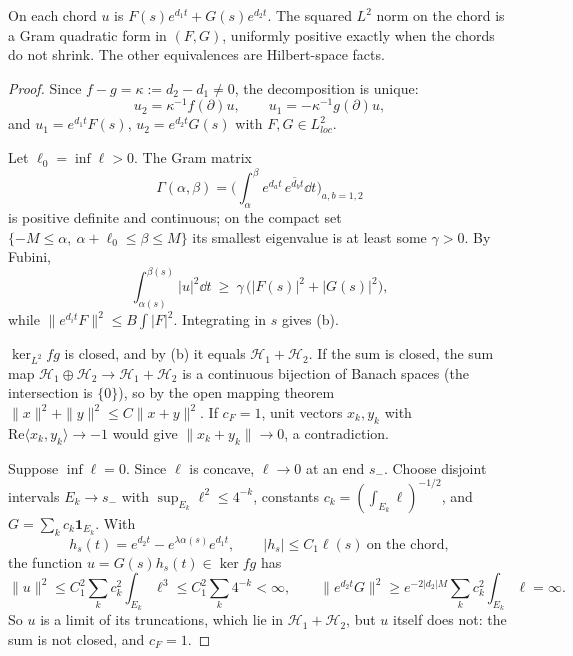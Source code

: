 \begin{proofidea}
On each chord $u$ is $F(s)e^{d_1t}+G(s)e^{d_2t}$. The squared $L^2$ norm on the chord is a Gram quadratic form in $(F,G)$, uniformly positive exactly when the chords do not shrink. The other equivalences are Hilbert-space facts.
\end{proofidea}

\begin{proof}
Since $f-g=\kappa:=d_2-d_1\ne0$, the decomposition is unique:
\[
u_2=\kappa^{-1}f(\partial)u,\qquad u_1=-\kappa^{-1}g(\partial)u,
\]
and $u_1=e^{d_1t}F(s)$, $u_2=e^{d_2t}G(s)$ with $F,G\in L^2_{loc}$.

Let $\ell_0=\inf\ell>0$. The Gram matrix
\[
\Gamma(\alpha,\beta)=\Big(\int_\alpha^\beta e^{d_at}\,\overline{e^{d_bt}}\dd t\Big)_{a,b=1,2}
\]
is positive definite and continuous; on the compact set $\{-M\le\alpha,\ \alpha+\ell_0\le\beta\le M\}$ its smallest eigenvalue is at least some $\gamma>0$. By Fubini,
\[
\int_{\alpha(s)}^{\beta(s)}|u|^2\dd t\ \ge\ \gamma\,\big(|F(s)|^2+|G(s)|^2\big),
\]
while $\|e^{d_it}F\|^2\le B\int|F|^2$. Integrating in $s$ gives (b).

$\ker_{L^2}fg$ is closed, and by (b) it equals $\mathcal H_1+\mathcal H_2$. If the sum is closed, the sum map $\mathcal H_1\oplus\mathcal H_2\to\mathcal H_1+\mathcal H_2$ is a continuous bijection of Banach spaces (the intersection is $\{0\}$), so by the open mapping theorem $\|x\|^2+\|y\|^2\le C\|x+y\|^2$. If $c_F=1$, unit vectors $x_k,y_k$ with $\mathrm{Re}\langle x_k,y_k\rangle\to-1$ would give $\|x_k+y_k\|\to0$, a contradiction.

Suppose $\inf\ell=0$. Since $\ell$ is concave, $\ell\to0$ at an end $s_-$. Choose disjoint intervals $E_k\to s_-$ with $\sup_{E_k}\ell^2\le4^{-k}$, constants $c_k=(\int_{E_k}\ell)^{-1/2}$, and $G=\sum_kc_k\mathbf 1_{E_k}$. With
\[
h_s(t)=e^{d_2t}-e^{\lambda\alpha(s)}e^{d_1t},\qquad |h_s|\le C_1\ell(s)\ \text{on the chord},
\]
the function $u=G(s)h_s(t)\in\ker fg$ has
\[
\|u\|^2\le C_1^2\sum_kc_k^2\int_{E_k}\ell^3\le C_1^2\sum_k4^{-k}<\infty,
\qquad
\|e^{d_2t}G\|^2\ge e^{-2|d_2|M}\sum_kc_k^2\int_{E_k}\ell=\infty .
\]
So $u$ is a limit of its truncations, which lie in $\mathcal H_1+\mathcal H_2$, but $u$ itself does not: the sum is not closed, and $c_F=1$.

\end{proof}


